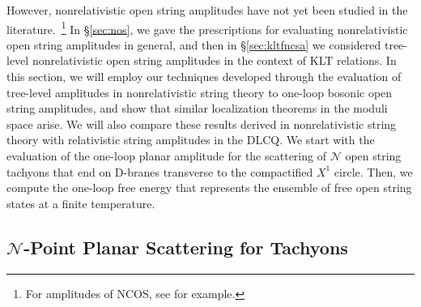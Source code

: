 \documentclass[11pt]{article}
\newcommand{\CN}{\mathcal{N}}
\begin{document}
However, nonrelativistic open string amplitudes have not yet been studied in the literature.~\footnote{For amplitudes of NCOS, see \cite{Klebanov:2000pp} for example.} In \S\ref{sec:nos}, we gave the prescriptions for evaluating nonrelativistic open string amplitudes in general, and then in \S\ref{sec:kltfncsa} we considered tree-level nonrelativistic open string amplitudes in the context of KLT relations. In this section, we will employ our techniques developed through the evaluation of tree-level amplitudes in nonrelativistic string theory to one-loop bosonic open string amplitudes, 
and show that similar localization theorems in the moduli space arise. We will also compare these results derived in nonrelativistic string theory with relativistic string amplitudes in the DLCQ.
We start with the evaluation of the one-loop planar amplitude for the scattering of $\CN$ open string tachyons that end on D-branes transverse to the compactified $X^1$ circle. Then, we compute the one-loop free energy that represents the ensemble of free open string states at a finite temperature.

\subsection{\texorpdfstring{$\CN$}{N}-Point Planar Scattering for Tachyons} 
\end{document}
